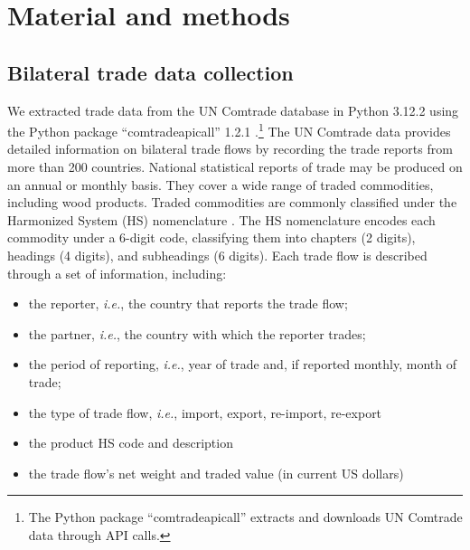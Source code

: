 \documentclass[
  authoryear,
  review,
  3p]{elsarticle}
\providecommand{\tightlist}{%
  \setlength{\itemsep}{0pt}\setlength{\parskip}{0pt}}
\begin{document}
\section{Material and methods}\label{material-and-methods}

\subsection{Bilateral trade data
collection}\label{bilateral-trade-data-collection}

We extracted trade data from the UN Comtrade database in Python 3.12.2
using the Python package ``comtradeapicall'' 1.2.1
\citep{untradestats_comtradeapicall_2024}.\footnote{The Python package
  ``comtradeapicall'' extracts and downloads UN Comtrade data through
  API calls.} The UN Comtrade data provides detailed information on
bilateral trade flows by recording the trade reports from more than 200
countries. National statistical reports of trade may be produced on an
annual or monthly basis. They cover a wide range of traded commodities,
including wood products. Traded commodities are commonly classified
under the Harmonized System (HS) nomenclature
\citep{world_customs_organization_international_1983}. The HS
nomenclature encodes each commodity under a 6-digit code, classifying
them into chapters (2 digits), headings (4 digits), and subheadings (6
digits). Each trade flow is described through a set of information,
including:

\begin{itemize}
\tightlist
\item
  the reporter, \emph{i.e.}, the country that reports the trade flow;
\item
  the partner, \emph{i.e.}, the country with which the reporter trades;
\item
  the period of reporting, \emph{i.e.}, year of trade and, if reported
  monthly, month of trade;
\item
  the type of trade flow, \emph{i.e.}, import, export, re-import,
  re-export
\item
  the product HS code and description
\item
  the trade flow's net weight and traded value (in current US dollars)
\end{itemize}
\end{document}
